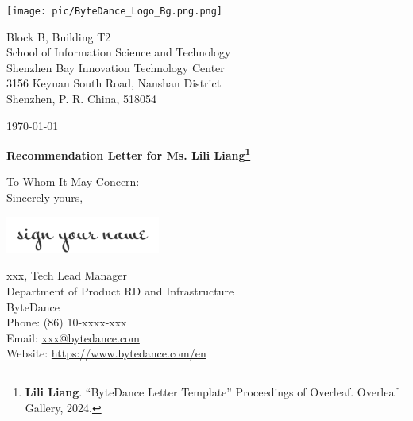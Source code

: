 \documentclass[12pt, a4paper]{letter} %
\begin{document}
    \begin{minipage}{0.5\textwidth}
        \vspace{0.3in} 
        \texttt{[image: pic/ByteDance\_Logo\_Bg.png.png]}\\ %
    \end{minipage}
    \hfill
    \begin{minipage}{0.6\textwidth}\raggedright
        \vspace{0.3in} 
        \small{
            \hphantom{AA}Block B, Building T2 \\ %
            \hphantom{AA}School of Information Science and Technology \\
            \hphantom{AA}Shenzhen Bay Innovation Technology Center \\
            \hphantom{AA}3156 Keyuan South Road, Nanshan District \\
            \hphantom{AA}Shenzhen, P. R. China, 518054
        }
    \end{minipage}

    \vspace{0.4in} %

    \today

    \textbf{Recommendation Letter for Ms. Lili Liang\footnote{\textbf{Lili Liang}. ``ByteDance Letter Template'' Proceedings of Overleaf. Overleaf Gallery, 2024.}}

    To Whom It May Concern:\\


    Sincerely yours,

    \includegraphics[width=2in]{pic/signature.png} %

    xxx, Tech Lead Manager \\ %
    Department of Product RD and Infrastructure \\
    ByteDance \\
    Phone: (86) 10-xxxx-xxx \\ 
    Email: \href{mailto:xxx@bytedance.com}{xxx@bytedance.com} \\
    Website: \url{https://www.bytedance.com/en} \\
\end{document}
